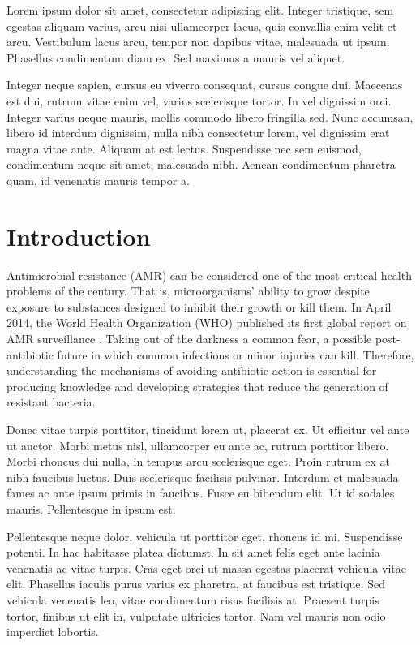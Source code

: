 \documentclass[
  12pt,
  a4paper,
  oneside]{krantz}
\begin{document}
Lorem ipsum dolor sit amet, consectetur adipiscing elit. Integer
tristique, sem egestas aliquam varius, arcu nisi ullamcorper lacus, quis
convallis enim velit et arcu. Vestibulum lacus arcu, tempor non dapibus
vitae, malesuada ut ipsum. Phasellus condimentum diam ex. Sed maximus a
mauris vel aliquet.

Integer neque sapien, cursus eu viverra consequat, cursus congue dui.
Maecenas est dui, rutrum vitae enim vel, varius scelerisque tortor. In
vel dignissim orci. Integer varius neque mauris, mollis commodo libero
fringilla sed. Nunc accumsan, libero id interdum dignissim, nulla nibh
consectetur lorem, vel dignissim erat magna vitae ante. Aliquam at est
lectus. Suspendisse nec sem euismod, condimentum neque sit amet,
malesuada nibh. Aenean condimentum pharetra quam, id venenatis mauris
tempor a.

\mainmatter

\hypertarget{introduction}{%
\chapter*{Introduction}\label{introduction}}


Antimicrobial resistance (AMR) can be considered one of the most
critical health problems of the century. That is, microorganisms'
ability to grow despite exposure to substances designed to inhibit their
growth or kill them. In April 2014, the World Health Organization (WHO)
published its first global report on AMR surveillance
\citep{EditorialBoard2014}. Taking out of the darkness a common fear, a
possible post-antibiotic future in which common infections or minor
injuries can kill. Therefore, understanding the mechanisms of avoiding
antibiotic action is essential for producing knowledge and developing
strategies that reduce the generation of resistant bacteria.

Donec vitae turpis porttitor, tincidunt lorem ut, placerat ex. Ut
efficitur vel ante ut auctor. Morbi metus nisl, ullamcorper eu ante ac,
rutrum porttitor libero. Morbi rhoncus dui nulla, in tempus arcu
scelerisque eget. Proin rutrum ex at nibh faucibus luctus. Duis
scelerisque facilisis pulvinar. Interdum et malesuada fames ac ante
ipsum primis in faucibus. Fusce eu bibendum elit. Ut id sodales mauris.
Pellentesque in ipsum est.

Pellentesque neque dolor, vehicula ut porttitor eget, rhoncus id mi.
Suspendisse potenti. In hac habitasse platea dictumst. In sit amet felis
eget ante lacinia venenatis ac vitae turpis. Cras eget orci ut massa
egestas placerat vehicula vitae elit. Phasellus iaculis purus varius ex
pharetra, at faucibus est tristique. Sed vehicula venenatis leo, vitae
condimentum risus facilisis at. Praesent turpis tortor, finibus ut elit
in, vulputate ultricies tortor. Nam vel mauris non odio imperdiet
lobortis.
\end{document}
